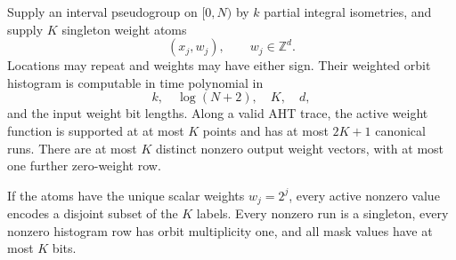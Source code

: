 \begin{theorem}
\label{int:sparse}
Supply an interval pseudogroup on $[0,N)$ by $k$ partial integral isometries,
and supply $K$ singleton weight atoms
\[
                        (x_j,w_j),\qquad w_j\in\mathbb Z^d.
\]
Locations may repeat and weights may have either sign.  Their weighted orbit
histogram is computable in time polynomial in
\[
                  k,\quad \log(N+2),\quad K,\quad d,
\]
and the input weight bit lengths.  Along a valid AHT trace, the active weight
function is supported at at most $K$ points and has at most $2K+1$ canonical
runs.  There are at most $K$ distinct nonzero output weight vectors, with at
most one further zero-weight row.

If the atoms have the unique scalar weights $w_j=2^j$, every active nonzero
value encodes a disjoint subset of the $K$ labels.  Every nonzero run is a
singleton, every nonzero histogram row has orbit multiplicity one, and all
mask values have at most $K$ bits.
\end{theorem}


